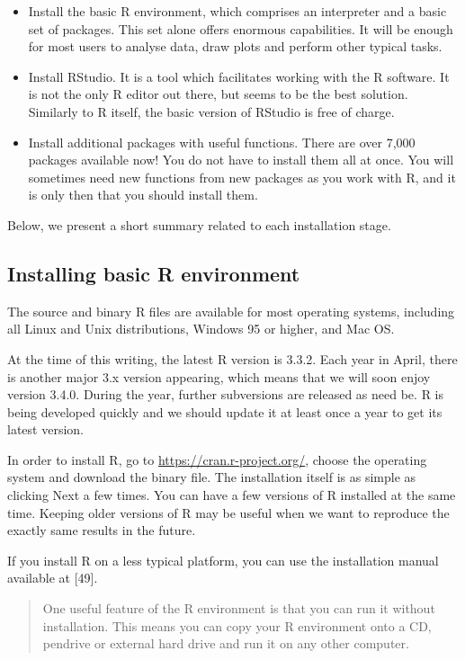 \documentclass[]{book}
\theoremstyle{definition}
\theoremstyle{definition}
\theoremstyle{definition}
\theoremstyle{remark}
\begin{document}
\begin{itemize}
\item
  Install the basic R environment, which comprises an interpreter and a
  basic set of packages. This set alone offers enormous capabilities. It
  will be enough for most users to analyse data, draw plots and perform
  other typical tasks.
\item
  Install RStudio. It is a tool which facilitates working with the R
  software. It is not the only R editor out there, but seems to be the
  best solution. Similarly to R itself, the basic version of RStudio is
  free of charge.
\item
  Install additional packages with useful functions. There are over
  7,000 packages available now! You do not have to install them all at
  once. You will sometimes need new functions from new packages as you
  work with R, and it is only then that you should install them.
\end{itemize}

Below, we present a short summary related to each installation stage.

\subsection{Installing basic R environment}\label{part_131}

The source and binary R files are available for most operating systems,
including all Linux and Unix distributions, Windows 95 or higher, and
Mac OS.

At the time of this writing, the latest R version is 3.3.2. Each year in
April, there is another major 3.x version appearing, which means that we
will soon enjoy version 3.4.0. During the year, further subversions are
released as need be. R is being developed quickly and we should update
it at least once a year to get its latest version.

In order to install R, go to \url{https://cran.r-project.org/}, choose
the operating system and download the binary file. The installation
itself is as simple as clicking Next a few times. You can have a few
versions of R installed at the same time. Keeping older versions of R
may be useful when we want to reproduce the exactly same results in the
future.

If you install R on a less typical platform, you can use the
installation manual available at {[}49{]}.

\begin{quote}
One useful feature of the R environment is that you can run it without
installation. This means you can copy your R environment onto a CD,
pendrive or external hard drive and run it on any other computer.
\end{quote}
\end{document}
